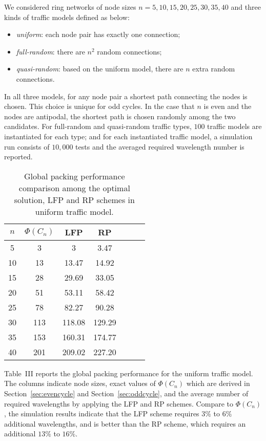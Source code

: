 \documentclass[journal,draftcls,onecolumn,12pt,twoside]{IEEEtran}
\begin{document}
We considered ring networks of node sizes $n=5, 10, 15, 20, 25, 30, 35, 40$ and three kinds of traffic models defined as below:
\begin{itemize}
\item \emph{uniform}: each node pair has exactly one connection;
\item \emph{full-random}: there are $n^2$ random connections;
\item \emph{quasi-random}: based on the uniform model, there are $n$ extra random connections.
\end{itemize}
In all three models, for any node pair a shortest path connecting the nodes is chosen.
This choice is unique for odd cycles.  In the case that $n$ is even and the nodes are antipodal,
the shortest path is chosen randomly among the two candidates. 
For full-random and quasi-random traffic types, $100$ traffic models are instantiated for each
type; and for each instantiated traffic model, a simulation run consists of $10,000$ tests 
and the averaged required wavelength number is reported.

\begin{table}[h]\label{tab:uniform}
\begin{tabular}{|c||c|c|c|c|c|c|}
\hline
$n$ & $\Phi(C_n)$ & LFP & RP \\ \hline \hline 
5 & 3 & 3 & 3.47 \\ \hline
10  & 13 & 13.47 & 14.92 \\ \hline
15 & 28 & 29.69 &  33.05 \\ \hline
20 & 51 & 53.11 & 58.42 \\ \hline
25 & 78 & 82.27 & 90.28 \\ \hline
30 & 113 & 118.08 & 129.29 \\ \hline
35 & 153 & 160.31 & 174.77 \\ \hline
40 & 201 & 209.02 & 227.20 \\ \hline
\end{tabular}
\caption{Global packing performance comparison among the optimal solution, LFP and RP schemes in uniform traffic model.}
\end{table}

Table~III reports the global packing performance for the uniform traffic model.
The columns indicate node sizes, exact values of $\Phi(C_n)$ which are derived in Section~\ref{sec:evencycle} and Section~\ref{sec:oddcycle}, and the average number of required wavelengths by applying the LFP and RP schemes.
Compare to $\Phi(C_n)$, the simulation results indicate that the LFP scheme requires
$3\%$ to $6\%$ additional wavelengths, and is better than the RP scheme, which requires
an additional $13\%$ to $16\%$.
\end{document}
